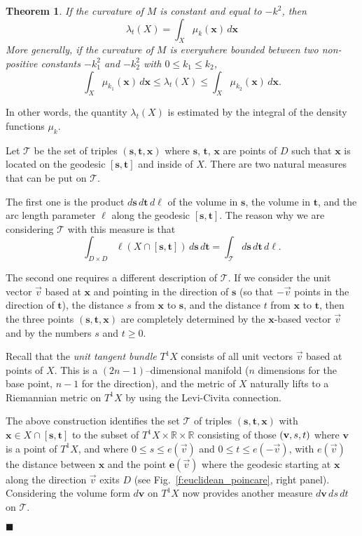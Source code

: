 \documentclass{article}
\newcommand{\s}{{\mathbf s}}
\renewcommand{\t}{{\mathbf t}}
\renewcommand{\v}{{\mathbf v}}
\newcommand{\x}{{\mathbf x}}
\newcommand{\e}{\mathbf{e}}
\newtheorem{theorem}{Theorem}
\newenvironment{proof}
{\noindent {\bf Proof.}}
{$\blacksquare$}
\begin{document}
\begin{theorem}
If the curvature of $M$ is constant and equal to $-k^2$, then 
$$\lambda_t(X) = \int_X \mu_{k} (\x) \, d\x $$
More generally,  if the curvature of $M$ is everywhere
bounded between two non-positive constants $-k_1^2$ and $-k_2^2$ with $0\leq k_1\leq k_2$,
$$
\int_X \mu_{k_1} (\x) \, d\x 
\leq \lambda_t(X) \leq
\int_X \mu_{k_2} (\x) \, d\x .
$$
\end{theorem}
In other words, the quantity $\lambda_t(X)$ is estimated by the integral of the density functions $\mu_k$.


\begin{proof}
Let $\mathcal T$ be the set of triples $(\s,\t,\x)$ where $\s$, $\t$, $\x$ are points of $D$ 
such that $\x$ is located on the geodesic $[\s,\t]$ and inside of $X$. 
There are two natural measures that can be put on $\mathcal T$.

The first one is the product $d\s\,d\t\,d\ell$ of the volume in $\s$, the volume in $\t$, 
and the arc length parameter $\ell$ along the geodesic $[\s,\t]$. 
The reason why we are considering $\mathcal T$ with this measure is that
$$
\int_{D\times D} \ell(X\cap [\s,\t]) \, d\s \, d\t
= \int_{\mathcal T} d\s\,d\t\,d\ell .
$$

The second one requires a different description of $\mathcal T$. 
If we consider the unit vector $\vec{v}$ based at $\x$ and pointing in the direction of $\s$ 
(so that $-\vec{v}$ points in the direction of $\t$), the distance $s$ from $\x$ to $\s$, 
and the distance $t$ from $\x$ to $\t$, 
then the three points $(\s,\t,\x)$ are completely determined by the $\x$-based vector $\vec{v}$ 
and by the numbers $s$ and $t \geq0$. 

Recall that the \emph{unit tangent bundle} $T^1X$ consists of all unit vectors $\vec{v}$ based at points of $X$. 
This is a $(2n-1)$--dimensional manifold ($n$ dimensions for the base point, $n-1$ for the direction), 
and the  metric of $X$  naturally lifts to a Riemannian metric on $T^1X$ by using the Levi-Civita connection. 

The above construction identifies the set $\mathcal T$ of triples $(\s,\t,\x)$ with $\x\in X\cap [\s,\t]$ 
to the subset of $T^1X \times \mathbb{R} \times \mathbb{R}$ consisting of those $({\bf v}, s, t)$ 
where $\v$ is a point of $T^1X$, and where $0\leq s \leq e(\vec{v})$ and $0\leq t \leq e(-\vec{v})$, 
with $e(\vec{v})$ the distance between $\x$ and the point $\e(\vec{v})$ where the geodesic starting at $\x$ along the direction $\vec{v}$ exits $D$ 
(see Fig.~\ref{f:euclidean_poincare}, right panel).  
Considering the volume form $d{\v}$ on $T^1X$ now provides another measure $d{\v}\,ds\,dt$ on $\mathcal T$. 


\end{proof}
\end{document}
